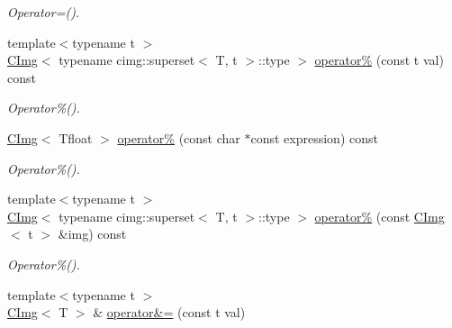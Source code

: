 \begin{DoxyCompactItemize}
\begin{DoxyCompactList}\small\item\em Operator=(). \item\end{DoxyCompactList}\item 
\hypertarget{structcimg__library_1_1CImg_ad9e46665e8f1b19a7456c5a0636b2bc8}{
{\footnotesize template$<$typename t $>$ }\\\hyperlink{structcimg__library_1_1CImg}{CImg}$<$ typename cimg::superset$<$ T, t $>$::type $>$ \hyperlink{structcimg__library_1_1CImg_ad9e46665e8f1b19a7456c5a0636b2bc8}{operator\%} (const t val) const }
\label{structcimg__library_1_1CImg_ad9e46665e8f1b19a7456c5a0636b2bc8}

\begin{DoxyCompactList}\small\item\em Operator\%(). \item\end{DoxyCompactList}\item 
\hypertarget{structcimg__library_1_1CImg_a282a91d163a0fd89244030904deed081}{
\hyperlink{structcimg__library_1_1CImg}{CImg}$<$ Tfloat $>$ \hyperlink{structcimg__library_1_1CImg_a282a91d163a0fd89244030904deed081}{operator\%} (const char $\ast$const expression) const }
\label{structcimg__library_1_1CImg_a282a91d163a0fd89244030904deed081}

\begin{DoxyCompactList}\small\item\em Operator\%(). \item\end{DoxyCompactList}\item 
\hypertarget{structcimg__library_1_1CImg_ab0adfd17da49c0c468fbb203ed689b4b}{
{\footnotesize template$<$typename t $>$ }\\\hyperlink{structcimg__library_1_1CImg}{CImg}$<$ typename cimg::superset$<$ T, t $>$::type $>$ \hyperlink{structcimg__library_1_1CImg_ab0adfd17da49c0c468fbb203ed689b4b}{operator\%} (const \hyperlink{structcimg__library_1_1CImg}{CImg}$<$ t $>$ \&img) const }
\label{structcimg__library_1_1CImg_ab0adfd17da49c0c468fbb203ed689b4b}

\begin{DoxyCompactList}\small\item\em Operator\%(). \item\end{DoxyCompactList}\item 
\hypertarget{structcimg__library_1_1CImg_ab52b5b84c3e25e2f65dd14e16fd9b674}{
{\footnotesize template$<$typename t $>$ }\\\hyperlink{structcimg__library_1_1CImg}{CImg}$<$ T $>$ \& \hyperlink{structcimg__library_1_1CImg_ab52b5b84c3e25e2f65dd14e16fd9b674}{operator\&=} (const t val)}
\label{structcimg__library_1_1CImg_ab52b5b84c3e25e2f65dd14e16fd9b674}


\end{DoxyCompactItemize}
